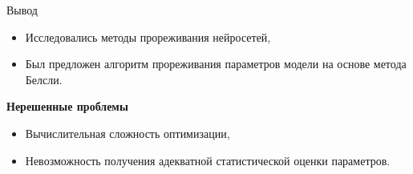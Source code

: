 \documentclass[10pt]{beamer}
\begin{document}

\begin{frame}{Вывод}

\begin{itemize}
	\item Исследовались методы прореживания нейросетей,
	\item Был предложен алгоритм прореживания параметров модели на основе метода Белсли.
\end{itemize}

{\bf Нерешенные проблемы}\\
	\begin{itemize}
		\item Вычислительная сложность оптимизации,
		\item Невозможность получения адекватной статистической оценки параметров.
	\end{itemize}

\end{frame}
\end{document}
